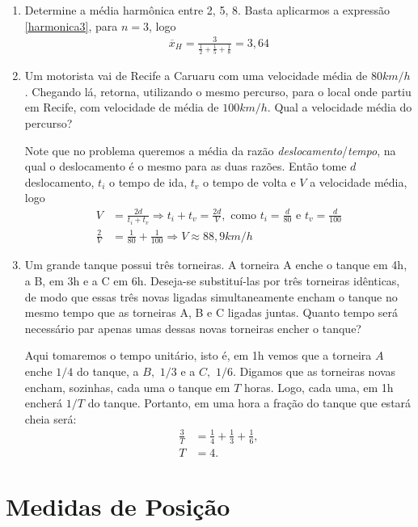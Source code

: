 \noindent \exemplo
\begin{enumerate}
    \item [(i)] Determine a média harmônica entre 2, 5, 8.
    Basta aplicarmos a expressão \ref{harmonica3}, para $n=3$, logo
    \begin{align*}
        \overline{x}_H = \frac{3}{\frac{1}{2} + \frac{1}{5} + \frac{1}{8}} = 3,64
    \end{align*}
    \item[(ii)] Um motorista vai de Recife a Caruaru com uma velocidade média de $80 km/h$. Chegando lá, retorna, utilizando o mesmo percurso, para o local onde partiu em Recife, com velocidade de média de $100 km/h$. Qual a velocidade média do percurso? 
    
    \inic Note que no problema queremos a média da razão \textit{deslocamento}/\textit{tempo}, na qual o deslocamento é o mesmo para as duas razões. Então tome $d$ deslocamento, $t_i$ o tempo de ida, $t_v$ o tempo de volta e $V$ a velocidade média, logo
    \begin{align*}
        V&= \frac{2d}{t_i + t_v}\Rightarrow t_i + t_v = \frac{2d}{V},\,\, \text{como}\,\, t_i = \frac{d}{80}\,\, \text{e}\,\, t_v = \frac{d}{100}\\
        \frac{2}{V} &= \frac{1}{80} + \frac{1}{100} \Rightarrow V \approx 88,9 km/h
    \end{align*}
    \item[(iii)] Um grande tanque possui três torneiras. A torneira A enche o tanque em 4h, a B, em 3h e a C em 6h. Deseja-se substituí-las por três torneiras idênticas, de modo que essas três novas ligadas simultaneamente encham o tanque no mesmo tempo que as torneiras A, B e C ligadas juntas. Quanto tempo será necessário par apenas umas dessas novas torneiras encher o tanque? 
    
    \inic Aqui tomaremos o tempo unitário, isto é, em 1h vemos que a torneira $A$ enche $1/4$ do tanque, a $B,\,\,1/3$ e a $C,\,\,1/6$. Digamos que as torneiras novas encham, sozinhas, cada uma o tanque em $T$ horas. Logo, cada uma, em 1h encherá $1/T$ do tanque. Portanto, em uma hora a fração do tanque que estará cheia será: 
    \begin{align*}
        \frac{3}{T} &= \frac{1}{4} + \frac{1}{3} + \frac{1}{6},\\
        T&=4.
    \end{align*}
\end{enumerate}

\section{Medidas de Posição}
